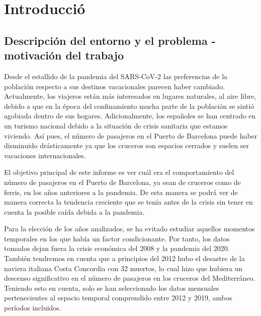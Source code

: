 \documentclass[
]{article}
\begin{document}
\newpage

\pagebreak

\tableofcontents

\pagebreak

\hypertarget{introducciuxf3}{%
\section{Introducció}\label{introducciuxf3}}

\hypertarget{descripciuxf3n-del-entorno-y-el-problema---motivaciuxf3n-del-trabajo}{%
\subsection{Descripción del entorno y el problema - motivación del
trabajo}\label{descripciuxf3n-del-entorno-y-el-problema---motivaciuxf3n-del-trabajo}}

Desde el estallido de la pandemia del SARS-CoV-2 las preferencias de la
población respecto a sus destinos vacacionales parecen haber cambiado.
Actualmente, los viajeros están más interesados en lugares naturales, al
aire libre, debido a que en la época del confinamiento mucha parte de la
población se sintió agobiada dentro de sus hogares. Adicionalmente, los
españoles se han centrado en un turismo nacional debido a la situación
de crisis sanitaria que estamos viviendo. Así pues, el número de
pasajeros en el Puerto de Barcelona puede haber disminuido drásticamente
ya que los cruceros son espacios cerrados y suelen ser vacaciones
internacionales.

El objetivo principal de este informe es ver cuál era el comportamiento
del número de pasajeros en el Puerto de Barcelona, ya sean de cruceros
como de ferris, en los años anteriores a la pandemia. De esta manera se
podrá ver de manera correcta la tendencia creciente que se tenía antes
de la crisis sin tener en cuenta la posible caída debida a la pandemia.

Para la elección de los años analizados, se ha evitado estudiar aquellos
momentos temporales en los que había un factor condicionante. Por tanto,
los datos tomados dejan fuera la crisis económica del 2008 y la pandemia
del 2020. También tendremos en cuenta que a principios del 2012 hubo el
desastre de la naviera italiana Costa Concordia con 32 muertos, lo cual
hizo que hubiera un descenso significativo en el número de pasajeros en
los cruceros del Mediterráneo. Teniendo esto en cuenta, solo se han
seleccionado los datos mensuales pertenecientes al espacio temporal
comprendido entre 2012 y 2019, ambos períodos incluidos.
\end{document}
